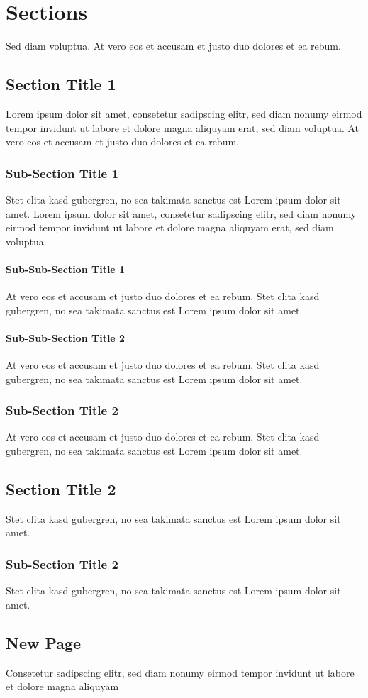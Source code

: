 \chapter{Sections}
\label{ch:sections}
Sed diam voluptua. At vero eos et accusam et justo duo dolores et ea rebum. 

\section{Section Title 1}
Lorem ipsum dolor sit amet, consetetur sadipscing elitr, sed diam nonumy eirmod tempor invidunt ut labore et dolore magna aliquyam erat, sed diam voluptua. At vero eos et accusam et justo duo dolores et ea rebum. 

\subsection{Sub-Section Title 1}
Stet clita kasd gubergren, no sea takimata sanctus est Lorem ipsum dolor sit amet. Lorem ipsum dolor sit amet, consetetur sadipscing elitr, sed diam nonumy eirmod tempor invidunt ut labore et dolore magna aliquyam erat, sed diam voluptua. 

\subsubsection{Sub-Sub-Section Title 1}
At vero eos et accusam et justo duo dolores et ea rebum. Stet clita kasd gubergren, no sea takimata sanctus est Lorem ipsum dolor sit amet.

\subsubsection{Sub-Sub-Section Title 2}
At vero eos et accusam et justo duo dolores et ea rebum. Stet clita kasd gubergren, no sea takimata sanctus est Lorem ipsum dolor sit amet.

\subsection{Sub-Section Title 2}
At vero eos et accusam et justo duo dolores et ea rebum. Stet clita kasd gubergren, no sea takimata sanctus est Lorem ipsum dolor sit amet.

\section{Section Title 2}
Stet clita kasd gubergren, no sea takimata sanctus est Lorem ipsum dolor sit amet.

\subsection{Sub-Section Title 2}
Stet clita kasd gubergren, no sea takimata sanctus est Lorem ipsum dolor sit amet.

\section{New Page}
Consetetur sadipscing elitr, sed diam nonumy eirmod tempor invidunt ut labore et dolore magna aliquyam 
\newpage